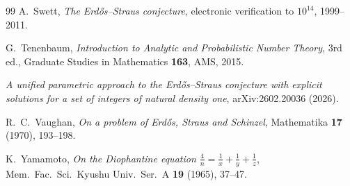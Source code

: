 \documentclass[11pt]{article}
\theoremstyle{definition}
\theoremstyle{remark}
\begin{document}
\begin{thebibliography}{99}
 A.~Swett,
\emph{The Erd\H{o}s--Straus conjecture}, electronic verification to $10^{14}$, 1999--2011.

 G.~Tenenbaum,
\emph{Introduction to Analytic and Probabilistic Number Theory}, 3rd ed.,
Graduate Studies in Mathematics \textbf{163}, AMS, 2015.

\emph{A unified parametric approach to the Erd\H{o}s--Straus conjecture with explicit
solutions for a set of integers of natural density one}, arXiv:2602.20036 (2026).

 R.~C.~Vaughan,
\emph{On a problem of Erd\H{o}s, Straus and Schinzel},
Mathematika \textbf{17} (1970), 193--198.

 K.~Yamamoto,
\emph{On the Diophantine equation $\frac{4}{n} = \frac{1}{x}+\frac{1}{y}+\frac{1}{z}$},
Mem.\ Fac.\ Sci.\ Kyushu Univ.\ Ser.~A \textbf{19} (1965), 37--47.

\end{thebibliography}
\end{document}
